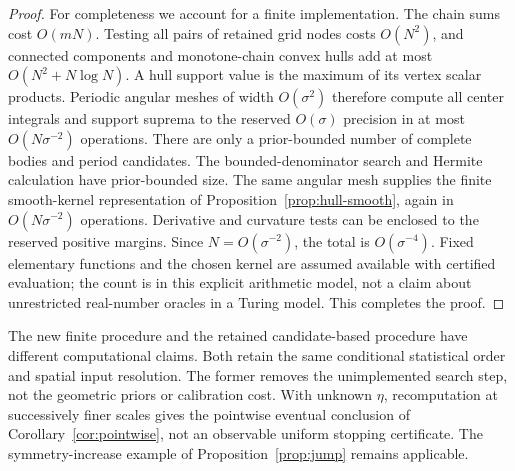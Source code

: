 \begin{proof}
For completeness we account for a finite implementation. The chain
sums cost $O(mN)$. Testing all pairs of retained grid nodes costs
$O(N^2)$, and connected components and monotone-chain convex hulls add
at most $O(N^2+N\log N)$. A hull support value is the maximum of its
vertex scalar products. Periodic angular meshes of width $O(\sigma^2)$
therefore compute all center integrals and support suprema to the
reserved $O(\sigma)$ precision in at most $O(N\sigma^{-2})$
operations. There are only a prior-bounded number of complete bodies
and period candidates. The bounded-denominator search and Hermite
calculation have prior-bounded size. The same angular mesh supplies
the finite smooth-kernel representation of
Proposition~\ref{prop:hull-smooth}, again in $O(N\sigma^{-2})$
operations. Derivative and curvature tests can be enclosed to the
reserved positive margins. Since $N=O(\sigma^{-2})$, the total is
$O(\sigma^{-4})$. Fixed elementary functions and the chosen kernel
are assumed available with certified evaluation; the count is in this
explicit arithmetic model, not a claim about unrestricted real-number
oracles in a Turing model. This completes the proof.
\end{proof}

The new finite procedure and the retained candidate-based procedure
have different computational claims. Both retain the same conditional
statistical order and spatial input resolution. The former removes the
unimplemented search step, not the geometric priors or calibration cost.
With unknown $\eta$, recomputation at successively finer scales gives
the pointwise eventual conclusion of Corollary~\ref{cor:pointwise},
not an observable uniform stopping certificate. The symmetry-increase
example of Proposition~\ref{prop:jump} remains applicable.
